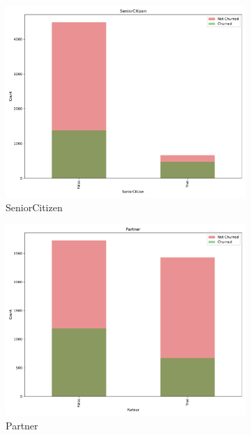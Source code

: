 \documentclass[a4paper,11pt]{article}
\begin{document}
\begin{landscape}
\begin{figure}
\begin{subfigure}{0.14\linewidth}
    \includegraphics[width=\linewidth]{figures/understanding/SeniorCitizen.pdf}
    \caption{SeniorCitizen}
\end{subfigure}%
\begin{subfigure}{0.14\linewidth}
    \includegraphics[width=\linewidth]{figures/understanding/Partner.pdf}
    \caption{Partner}
    \end{subfigure}
\begin{subfigure}{0.14\linewidth}

\end{subfigure}
\end{figure}
\end{landscape}
\end{document}
